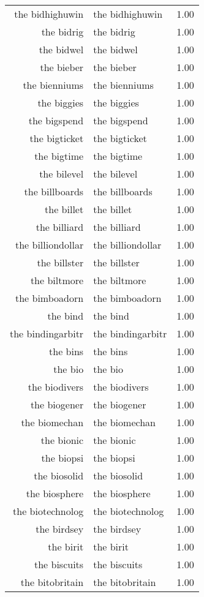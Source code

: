 \begin{table}[ht]
\begin{tabular}{rlr}
  the bidhighuwin & the bidhighuwin & 1.00 \\ 
  the bidrig & the bidrig & 1.00 \\ 
  the bidwel & the bidwel & 1.00 \\ 
  the bieber & the bieber & 1.00 \\ 
  the bienniums & the bienniums & 1.00 \\ 
  the biggies & the biggies & 1.00 \\ 
  the bigspend & the bigspend & 1.00 \\ 
  the bigticket & the bigticket & 1.00 \\ 
  the bigtime & the bigtime & 1.00 \\ 
  the bilevel & the bilevel & 1.00 \\ 
  the billboards & the billboards & 1.00 \\ 
  the billet & the billet & 1.00 \\ 
  the billiard & the billiard & 1.00 \\ 
  the billiondollar & the billiondollar & 1.00 \\ 
  the billster & the billster & 1.00 \\ 
  the biltmore & the biltmore & 1.00 \\ 
  the bimboadorn & the bimboadorn & 1.00 \\ 
  the bind & the bind & 1.00 \\ 
  the bindingarbitr & the bindingarbitr & 1.00 \\ 
  the bins & the bins & 1.00 \\ 
  the bio & the bio & 1.00 \\ 
  the biodivers & the biodivers & 1.00 \\ 
  the biogener & the biogener & 1.00 \\ 
  the biomechan & the biomechan & 1.00 \\ 
  the bionic & the bionic & 1.00 \\ 
  the biopsi & the biopsi & 1.00 \\ 
  the biosolid & the biosolid & 1.00 \\ 
  the biosphere & the biosphere & 1.00 \\ 
  the biotechnolog & the biotechnolog & 1.00 \\ 
  the birdsey & the birdsey & 1.00 \\ 
  the birit & the birit & 1.00 \\ 
  the biscuits & the biscuits & 1.00 \\ 
  the bitobritain & the bitobritain & 1.00 \\ 

\end{tabular}
\end{table}
